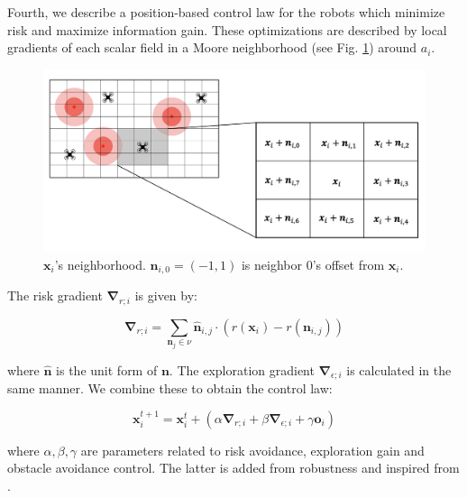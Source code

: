 Fourth, we describe a position-based control law for the robots which minimize risk and maximize information gain. These optimizations are described by local gradients of each scalar field in a Moore neighborhood (see Fig. \ref{neighborhood}) around $a_i$.

\begin{figure}[htbp]
	\centering
    \includegraphics[width=0.95\columnwidth]{figures/dora_explorer/Moore.png}
    \caption[Moore neighborhood]{$\bm{x}_i$'s neighborhood. $\bm{n}_{i,0} = (-1, 1)$ is neighbor 0's offset from $\bm{x}_i$.}
    \label{neighborhood}
\end{figure}

The risk gradient $\bm{\nabla}_{r;i}$ is given by:

\begin{equation}
    \bm{\nabla}_{r;i} = \sum_{\bm{n}_j \in \nu}\bm{\hat{n}}_{i,j} \cdot (r(\bm{x}_i) - r(\bm{n}_{i,j}))
    \label{eq:gradient}
\end{equation}

where $\bm{\hat{n}}$ is the unit form of $\bm{n}$. The exploration gradient $\bm{\nabla}_{\epsilon;i}$ is calculated in the same manner. We combine these to obtain the control law:

\begin{equation}
    \bm{x}_i^{t+1} = \bm{x}_i^t + (\alpha\bm{\nabla}_{r;i} + \beta\bm{\nabla}_{\epsilon;i} + \gamma\bm{o}_i)
    \label{eq:control_law}
\end{equation}

where $\alpha, \beta, \gamma$ are parameters related to risk avoidance, exploration gain and obstacle avoidance control. The latter is added from robustness and inspired from \cite{shahriari2018lightweight}.

